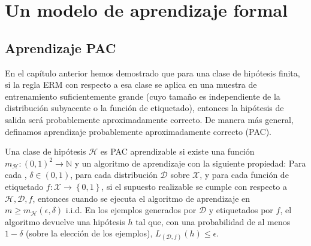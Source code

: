 \chapter{Un modelo de aprendizaje formal}

\section{Aprendizaje PAC}
En el capítulo anterior hemos demostrado que para una clase de hipótesis finita, si la regla ERM con respecto a esa clase se aplica en una muestra de entrenamiento suficientemente grande (cuyo tamaño es independiente de la distribución subyacente o la función de etiquetado), entonces la hipótesis de salida será probablemente aproximadamente correcto. De manera más general, definamos aprendizaje probablemente aproximadamente correcto (PAC).\\

\begin{def.} Una clase de hipótesis $\mathcal{H}$ es PAC aprendizable si existe una función $m_{\mathcal{H}} : (0, 1)^2 \to \mathbb{N}$ y un algoritmo de aprendizaje con la siguiente propiedad: Para cada , $\delta \in (0, 1)$, para cada distribución $\mathcal{D}$ sobre $\mathcal{X}$, y para cada función de etiquetado $f: \mathcal{X} \to \left\{0, 1\right\}$, si el supuesto realizable se cumple con respecto a $\mathcal{H}, \mathcal{D}, f$, entonces cuando se ejecuta el algoritmo de aprendizaje en $m \geq m_{\mathcal{H}}(\epsilon, \delta)$ i.i.d. En los ejemplos generados por $\mathcal{D}$ y etiquetados por $f$, el algoritmo devuelve una hipótesis $h$ tal que, con una probabilidad de al menos $1 -\delta$ (sobre la elección de los ejemplos), $L_{(\mathcal{D},f)}(h) \leq \epsilon$.
\end{def.}


